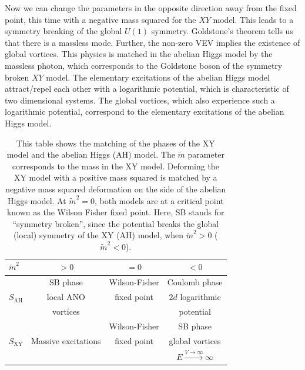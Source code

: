     \indent Now we can change the parameters in the opposite direction away from the fixed point, this time with a negative mass squared for the $XY$ model. This leads to a symmetry breaking of the global $U(1)$ symmetry. Goldstone's theorem tells us that there is a massless mode. Further, the non-zero VEV implies the existence of global vortices. This physics is matched in the abelian Higgs model by the massless photon, which corresponds to the Goldstone boson of the symmetry broken $XY$ model. The elementary excitations of the abelian Higgs model attract/repel each other with a logarithmic potential, which is characteristic of two dimensional systems. The global vortices, which also experience such a logarithmic potential, correspond to the elementary excitations of the abelian Higgs model. 
    \begin{table}
\begin{center}
  \begin{tabular}{| l | c | c | c|}
      \hline
      $\tilde{m}^2$           &  $>0$                  & $=0$                           &  $<0$                                               \\\hline
                    &  SB phase              & Wilson-Fisher &  Coulomb phase                                      \\                             
      $S_{\text{AH}}$ &  local ANO             &  fixed point                   &  $2d$ logarithmic                                   \\                           
                    &  vortices              &                                &  potential                                          \\\hline
                    &     & Wilson-Fisher &  SB phase                                           \\                
      $S_{\text{XY}}$ &  Massive excitations                    & fixed point                    &  global vortices                                    \\                                  
                    &           &                                &  $E\xrightarrow{V \rightarrow \infty} \infty$       \\                      
    \hline
  \end{tabular}
\end{center}
        \caption[This table shows the matching of the phases of the XY model and the abelian Higgs model.]{This table shows the matching of the phases of the XY model and the abelian Higgs (AH) model. The $\tilde{m}$ parameter corresponds to the mass in the XY model. Deforming the XY model with a positive mass squared is matched by a negative mass squared deformation on the side of the abelian Higgs model. At $\tilde{m}^2=0$, both models are at a critical point known as the Wilson Fisher fixed point. Here, SB stands for ``symmetry broken'', since the potential breaks the global (local) symmetry of the XY (AH) model, when $\tilde{m}^2>0$ ($\tilde{m}^2<0$). }
        \label{table:PV_Duality}
    \end{table}

